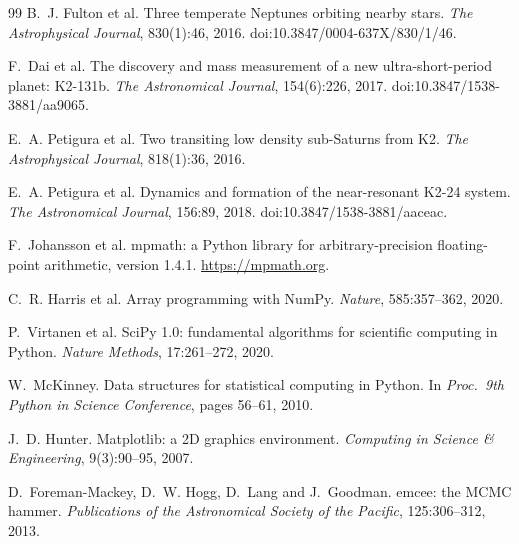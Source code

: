 \documentclass[sigconf,nonacm]{acmart}
\begin{document}
\begin{thebibliography}{99}
B.~J. Fulton et al.
Three temperate Neptunes orbiting nearby stars.
\emph{The Astrophysical Journal}, 830(1):46, 2016.
doi:10.3847/0004-637X/830/1/46.

F.~Dai et al.
The discovery and mass measurement of a new ultra-short-period planet:
K2-131b.
\emph{The Astronomical Journal}, 154(6):226, 2017.
doi:10.3847/1538-3881/aa9065.

E.~A. Petigura et al.
Two transiting low density sub-Saturns from K2.
\emph{The Astrophysical Journal}, 818(1):36, 2016.

E.~A. Petigura et al.
Dynamics and formation of the near-resonant K2-24 system.
\emph{The Astronomical Journal}, 156:89, 2018.
doi:10.3847/1538-3881/aaceac.

F.~Johansson et al.
mpmath: a Python library for arbitrary-precision floating-point
arithmetic, version 1.4.1. \url{https://mpmath.org}.

C.~R. Harris et al.
Array programming with NumPy.
\emph{Nature}, 585:357--362, 2020.

P.~Virtanen et al.
SciPy 1.0: fundamental algorithms for scientific computing in Python.
\emph{Nature Methods}, 17:261--272, 2020.

W.~McKinney.
Data structures for statistical computing in Python.
In \emph{Proc.\ 9th Python in Science Conference}, pages 56--61, 2010.

J.~D. Hunter.
Matplotlib: a 2D graphics environment.
\emph{Computing in Science \& Engineering}, 9(3):90--95, 2007.

D.~Foreman-Mackey, D.~W. Hogg, D.~Lang and J.~Goodman.
emcee: the MCMC hammer.
\emph{Publications of the Astronomical Society of the Pacific},
125:306--312, 2013.

\end{thebibliography}
\end{document}
